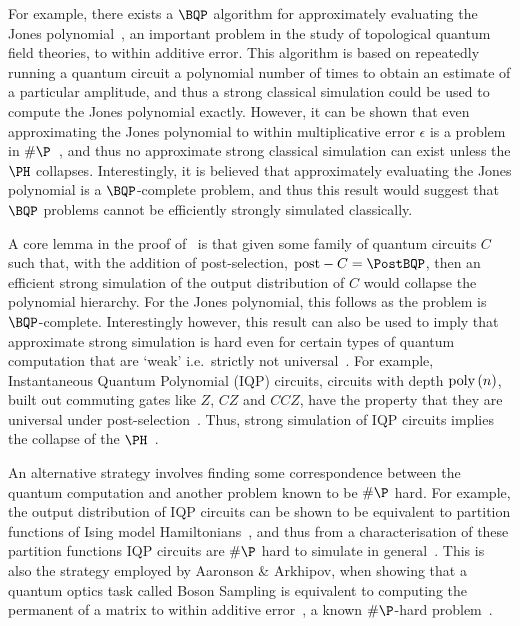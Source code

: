 For example, there exists a $\BQP$ algorithm for approximately evaluating the Jones polynomial~\cite{Aharonov2007}, an important problem in the study of topological quantum field theories, to within additive error. This algorithm is based on repeatedly running a quantum circuit a polynomial number of times to obtain an estimate of a particular amplitude, and thus a strong classical simulation could be used to compute the Jones polynomial exactly. However, it can be shown that even approximating the Jones polynomial to within multiplicative error $\epsilon$ is a problem in $\#\P$~\cite{Kuperberg2009}, and thus no approximate strong classical simulation can exist unless the $\PH$ collapses. Interestingly, it is believed that approximately evaluating the Jones polynomial is a $\BQP$-complete problem, and thus this result would suggest that $\BQP$ problems cannot be efficiently strongly simulated classically.\par
A core lemma in the proof of~\cite{Kuperberg2009} is that given some family of quantum circuits $C$ such that, with the addition of post-selection, $\text{post}-C=\PostBQP$, then an efficient strong simulation of the output distribution of $C$ would collapse the polynomial hierarchy. For the Jones polynomial, this follows as the problem is $\BQP$-complete. Interestingly however, this result can also be used to imply that approximate strong simulation is hard even for certain types of quantum computation that are `weak' i.e.\ strictly not universal~\cite{Aaronson2010}. For example, Instantaneous Quantum Polynomial (IQP) circuits, circuits with depth $\text{poly}\left(n\right)$, built out commuting gates like $Z$, $CZ$ and $CCZ$, have the property that they are universal under post-selection~\cite{Bremner2011}. Thus, strong simulation of IQP circuits implies the collapse of the $\PH$~\cite{Goldberg2014}.\par
An alternative strategy involves finding some correspondence between the quantum computation and another problem known to be $\#\P$ hard. For example, the output distribution of IQP circuits can be shown to be equivalent to partition functions of Ising model Hamiltonians~\cite{Fujii2017}, and thus from a characterisation of these partition functions IQP circuits are $\#\P$ hard to simulate in general~\cite{Goldberg2014}. This is also the strategy employed by Aaronson \& Arkhipov, when showing that a quantum optics task called Boson Sampling is equivalent to computing the permanent of a matrix to within additive error~\cite{Aaronson2010}, a known $\#\P$-hard problem~\cite{Valiant1979}.
